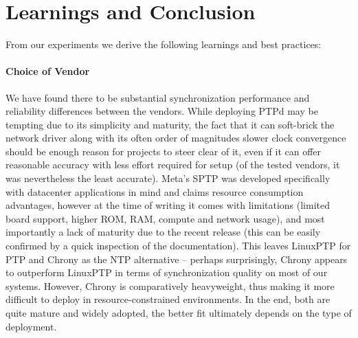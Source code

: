 \section{Learnings and Conclusion}
\label{sec:learnings_conclusion}
\label{sec:discussion}
\label{sec:learning}
From our experiments we derive the following learnings and best practices:

\paragraph{Choice of Vendor} We have found there to be substantial synchronization performance and reliability differences between the vendors. While deploying PTPd may be tempting due to its simplicity and maturity, the fact that it can soft-brick the network driver along with its often order of magnitudes slower clock convergence
should be enough reason for projects to steer clear of it, even if it can offer reasonable accuracy with less effort required for setup (of the tested vendors, it was nevertheless the least accurate). Meta's SPTP was developed specifically with datacenter applications in mind and claims resource consumption advantages, however at the time of writing it comes with limitations (limited board support, higher ROM, RAM, compute and network usage), and most importantly a lack of maturity due to the recent release (this can be easily confirmed by a quick inspection of the documentation). This leaves LinuxPTP for PTP and Chrony as the NTP alternative -- perhaps surprisingly, Chrony appears to outperform LinuxPTP in terms of synchronization quality on most of our systems. However, Chrony is comparatively heavyweight, thus making it more difficult to deploy in resource-constrained environments. In the end, both are quite mature and widely adopted, the better fit ultimately depends on the type of deployment.

